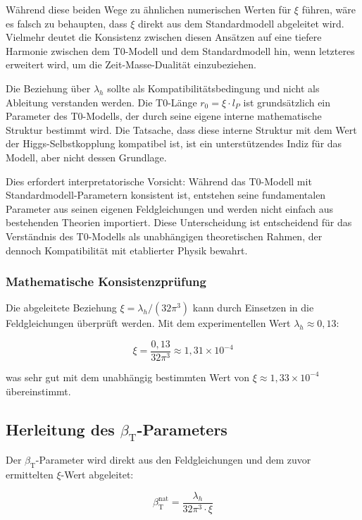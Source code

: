 \documentclass[12pt,a4paper]{article}
\newcommand{\betaT}{\beta_{\text{T}}}
\begin{document}
	Während diese beiden Wege zu ähnlichen numerischen Werten für \(\xi\) führen, wäre es falsch zu behaupten, dass \(\xi\) direkt aus dem Standardmodell abgeleitet wird. Vielmehr deutet die Konsistenz zwischen diesen Ansätzen auf eine tiefere Harmonie zwischen dem T0-Modell und dem Standardmodell hin, wenn letzteres erweitert wird, um die Zeit-Masse-Dualität einzubeziehen.
	
	Die Beziehung über \(\lambda_h\) sollte als Kompatibilitätsbedingung und nicht als Ableitung verstanden werden. Die T0-Länge \(r_0 = \xi \cdot l_P\) ist grundsätzlich ein Parameter des T0-Modells, der durch seine eigene interne mathematische Struktur bestimmt wird. Die Tatsache, dass diese interne Struktur mit dem Wert der Higgs-Selbstkopplung kompatibel ist, ist ein unterstützendes Indiz für das Modell, aber nicht dessen Grundlage.
	
	Dies erfordert interpretatorische Vorsicht: Während das T0-Modell mit Standardmodell-Parametern konsistent ist, entstehen seine fundamentalen Parameter aus seinen eigenen Feldgleichungen und werden nicht einfach aus bestehenden Theorien importiert. Diese Unterscheidung ist entscheidend für das Verständnis des T0-Modells als unabhängigen theoretischen Rahmen, der dennoch Kompatibilität mit etablierter Physik bewahrt.
	
	\subsubsection{Mathematische Konsistenzprüfung}
	
	Die abgeleitete Beziehung \(\xi = \lambda_h/(32\pi^3)\) kann durch Einsetzen in die Feldgleichungen überprüft werden. Mit dem experimentellen Wert \(\lambda_h \approx 0,13\):
	
	\begin{equation}
		\xi = \frac{0,13}{32\pi^3} \approx 1,31 \times 10^{-4}
	\end{equation}
	
	was sehr gut mit dem unabhängig bestimmten Wert von \(\xi \approx 1,33 \times 10^{-4}\) übereinstimmt.
	
	\subsection{Herleitung des \(\betaT\)-Parameters}
	
	Der \(\betaT\)-Parameter wird direkt aus den Feldgleichungen und dem zuvor ermittelten \(\xi\)-Wert abgeleitet:
	
	\begin{equation}
		\betaT^{\text{nat}} = \frac{\lambda_h}{32\pi^3 \cdot \xi}
	\end{equation}
	
\end{document}
